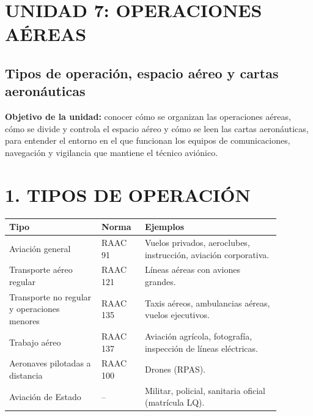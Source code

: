 \clearpage
\section*{UNIDAD 7: OPERACIONES AÉREAS}
\subsection*{Tipos de operación, espacio aéreo y cartas aeronáuticas}

\begin{recuadro}
\textbf{Objetivo de la unidad:} conocer cómo se organizan las operaciones aéreas, cómo se divide y
controla el espacio aéreo y cómo se leen las cartas aeronáuticas, para entender el entorno en el
que funcionan los equipos de comunicaciones, navegación y vigilancia que mantiene el técnico
aviónico.
\end{recuadro}

\section*{1. TIPOS DE OPERACIÓN}

\begin{center}
\small
\begin{tabular}{|p{0.30\linewidth}|p{0.14\linewidth}|p{0.44\linewidth}|}
\hline
\textbf{Tipo} & \textbf{Norma} & \textbf{Ejemplos} \\ \hline
Aviación general & RAAC 91 & Vuelos privados, aeroclubes, instrucción, aviación corporativa. \\
\hline
Transporte aéreo regular & RAAC 121 & Líneas aéreas con aviones grandes. \\ \hline
Transporte no regular y operaciones menores & RAAC 135 & Taxis aéreos, ambulancias aéreas,
vuelos ejecutivos. \\ \hline
Trabajo aéreo & RAAC 137 & Aviación agrícola, fotografía, inspección de líneas eléctricas. \\
\hline
Aeronaves pilotadas a distancia & RAAC 100 & Drones (RPAS). \\ \hline
Aviación de Estado & -- & Militar, policial, sanitaria oficial (matrícula LQ). \\ \hline
\end{tabular}
\end{center}

